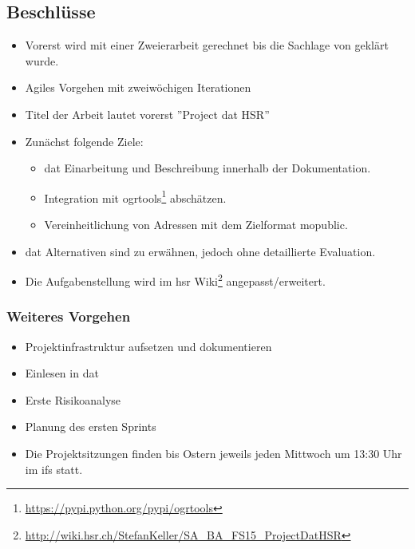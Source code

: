 \documentclass[class=scrbook,crop=false]{standalone}
\begin{document}
	\subsection*{Beschlüsse}
	\begin{itemize}
		\item Vorerst wird mit einer Zweierarbeit gerechnet bis die Sachlage von \chu geklärt wurde.
		\item Agiles Vorgehen mit zweiwöchigen Iterationen
		\item Titel der Arbeit lautet vorerst ''Project dat HSR''
		\item Zunächst folgende Ziele:
		\begin{itemize}
			\item \gls{dat} Einarbeitung und Beschreibung innerhalb der Dokumentation.
			\item Integration mit ogrtools\footnote{\url{https://pypi.python.org/pypi/ogrtools}} abschätzen.
			\item Vereinheitlichung von Adressen mit dem Zielformat \gls{mopublic}.
		\end{itemize}
		\item \gls{dat} Alternativen sind zu erwähnen, jedoch ohne detaillierte Evaluation.
		\item Die Aufgabenstellung wird im \acs{hsr} Wiki\footnote{\url{http://wiki.hsr.ch/StefanKeller/SA_BA_FS15_ProjectDatHSR}} angepasst/erweitert.
	\end{itemize}
	
	\subsubsection*{Weiteres Vorgehen}
	\begin{itemize}
		\item Projektinfrastruktur aufsetzen und dokumentieren
		\item Einlesen in \gls{dat}
		\item Erste Risikoanalyse
		\item Planung des ersten Sprints
		\item Die Projektsitzungen finden bis Ostern jeweils jeden Mittwoch um 13:30 Uhr im \acs{ifs} statt.
	\end{itemize}
	
\end{document}
